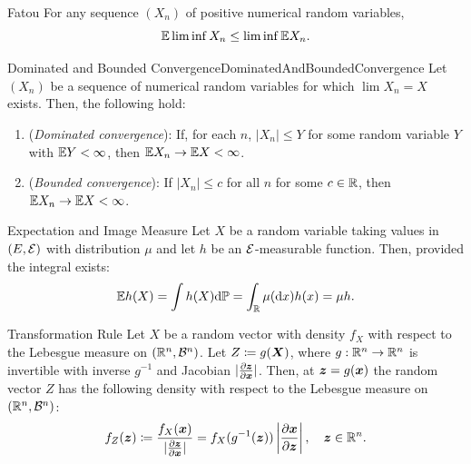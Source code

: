\begin{lem}{Fatou}{}
	For any sequence \((X_n)\) of positive numerical random variables,
	\begin{equation*}
		\mathbb{E} \liminf X_n \le \liminf \mathbb{E} X_n.
	\end{equation*}
\end{lem}

\begin{thm}{Dominated and Bounded Convergence}{DominatedAndBoundedConvergence}
	Let \((X_n)\) be a sequence of numerical random variables for which \(\lim X_n = X\) exists. Then, the following hold:
	\begin{enumerate}
		\item (\textit{Dominated convergence}): If, for each \(n\), \(|X_n| \le Y\) for some random variable \(Y\) with \(\mathbb{E} Y < \infty\), then \(\mathbb{E} X_n \to \mathbb{E} X < \infty\).
		\item (\textit{Bounded convergence}): If \(|X_n| \le c\) for all \(n\) for some \(c \in \mathbb{R}\), then \(\mathbb{E} X_n \to \mathbb{E} X < \infty\).
	\end{enumerate}
\end{thm}

\begin{thm}{Expectation and Image Measure}{}
	Let \(X\) be a random variable taking values in \((E, \mathcal{E})\) with distribution \(\mu\) and let \(h\) be an \(\mathcal{E}\)-measurable function. Then, provided the integral exists:
	\begin{equation*}
		\mathbb{E} h(X) = \int h(X) \mathrm{d} \mathbb{P} = \int_{\mathbb{R}} \mu(\mathrm{d} x) h(x) = \mu h.
	\end{equation*}
\end{thm}

\begin{thm}{Transformation Rule}{}
	Let \(X\) be a random vector with density \(f_X\) with respect to the Lebesgue measure on \((\mathbb{R}^n, \mathcal{B}^n)\). Let \(Z \coloneqq g(\boldsymbol{X})\), where \(g: \mathbb{R}^n \to \mathbb{R}^n\) is invertible with inverse \(g^{-1}\) and Jacobian \(|\frac{\partial \boldsymbol{z}}{\partial \boldsymbol{x}}|\). Then, at \(\boldsymbol{z} = g(\boldsymbol{x})\) the random vector \(Z\) has the following density with respect to the Lebesgue measure on \((\mathbb{R}^n, \mathcal{B}^n)\):
	\begin{equation}
		f_Z(\boldsymbol{z}) \coloneqq \frac{f_X(\boldsymbol{x})}{|\frac{\partial \boldsymbol{z}}{\partial \boldsymbol{x}}|} = f_X(g^{-1}(\boldsymbol{z})) \left|\frac{\partial \boldsymbol{x}}{\partial \boldsymbol{z}}\right|, \quad \boldsymbol{z} \in \mathbb{R}^n.
		\label{eq:TransformationRuleDensity}
	\end{equation}
\end{thm}

